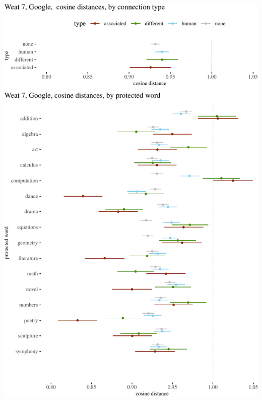 \documentclass{clv3}
\begin{document}
\label{appendix:visualizations}

\begin{center}\includegraphics{figures/weatjoint2z} \end{center}

\pagebreak
\end{document}
